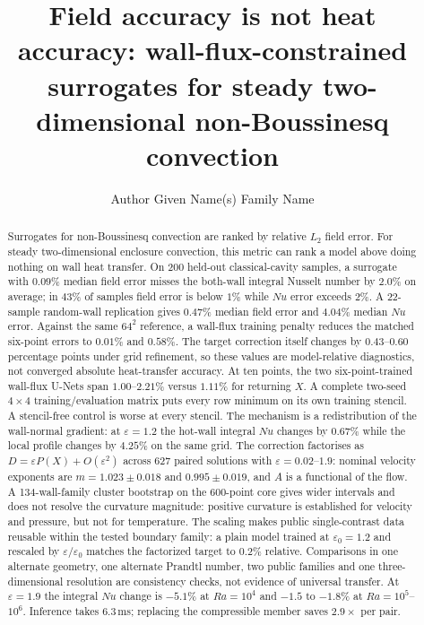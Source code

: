 \documentclass[preprint,11pt,a4paper,times]{elsarticle}
\begin{document}
\begin{frontmatter}

\title{Field accuracy is not heat accuracy: wall-flux-constrained surrogates
for steady two-dimensional non-Boussinesq convection}

\author[a]{Author Given Name(s) Family Name}
\address[a]{Department, Institution, City, Country}

\begin{abstract}
Surrogates for non-Boussinesq convection are ranked by relative $L_2$ field error. For
steady two-dimensional enclosure convection, this metric can rank a model above doing
nothing on wall heat transfer. On 200 held-out classical-cavity samples, a surrogate with
$0.09\%$ median field error misses the both-wall integral Nusselt number by $2.0\%$ on
average; in $43\%$ of samples field error is below $1\%$ while $Nu$ error exceeds $2\%$. A
22-sample random-wall replication gives $0.47\%$ median field error and $4.04\%$ median $Nu$
error. Against the same $64^2$ reference, a wall-flux training penalty reduces the matched
six-point errors to $0.01\%$ and $0.58\%$. The target correction itself changes by
$0.43$--$0.60$ percentage points under grid refinement, so these values are model-relative
diagnostics, not converged absolute heat-transfer accuracy. At ten points, the two
six-point-trained wall-flux U-Nets span $1.00$--$2.21\%$ versus $1.11\%$ for returning $X$.
A complete two-seed $4\times4$ training/evaluation matrix puts every row minimum on its own
training stencil. A stencil-free control is worse at every stencil. The mechanism is a redistribution of the wall-normal
gradient: at $\varepsilon=1.2$ the hot-wall integral $Nu$ changes by $0.67\%$ while the local
profile changes by $4.25\%$ on the same grid. The correction factorises as
$D=\varepsilon P(X)+O(\varepsilon^2)$ across 627 paired solutions with
$\varepsilon=0.02$--$1.9$: nominal velocity exponents are
$m=1.023\pm0.018$ and $0.995\pm0.019$, and $A$ is a functional of the flow. A
134-wall-family cluster bootstrap on the 600-point core gives wider intervals and does not
resolve the curvature magnitude: positive curvature is established for velocity and pressure,
but not for temperature. The scaling makes public single-contrast data reusable within the
tested boundary family: a plain model trained at $\varepsilon_0=1.2$ and rescaled by
$\varepsilon/\varepsilon_0$ matches the factorized target to $0.2\%$ relative. Comparisons in
one alternate geometry, one alternate Prandtl number, two public families and one
three-dimensional resolution are consistency checks, not evidence of universal transfer.
At $\varepsilon=1.9$ the integral $Nu$ change is $-5.1\%$ at $Ra=10^4$ and $-1.5$ to
$-1.8\%$ at $Ra=10^5$--$10^6$. Inference takes 6.3\,ms; replacing the compressible member
saves $2.9\times$ per pair.
\end{abstract}


\end{frontmatter}
\end{document}
